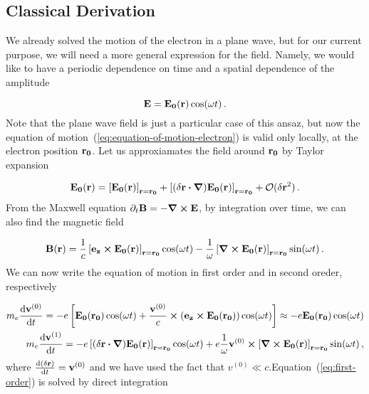\documentclass[12pt, class=report, crop=false]{standalone}
\begin{document}
\subsection{Classical Derivation}

We already solved the motion of the electron in a plane wave, but for our current purpose, we will need a more general expression for the field. Namely, we would like to have a periodic dependence on time and a spatial dependence of the amplitude

\begin{equation}
  \vb{E} = \vb{E_0}(\vb{r}) \cos(\omega t)\,.
\end{equation}
Note that the plane wave field is just a particular case of this ansaz, but now the equation of motion~(\ref{eq:equation-of-motion-electron}) is valid only locally, at the electron position \(\vb{r_0}\). Let us approxiamates the field around \(\vb{r_0}\) by Taylor expansion

\begin{equation}
  \vb{E_0}(\vb{r}) = \left[\vb{E_0}(\vb{r})\right]_{\vb{r}=\vb{r_0}} + \left[(\delta \vb{r}\vdot\grad)\vb{E_0}(\vb{r})\right] _{\vb{r}=\vb{r_0}} + \mathcal{O}(\delta\vb{r}^2)\,.
\end{equation}
From the Maxwell equation \(\partial_t \vb{B} = - \curl{\vb{E}}\), by integration over time, we can also find the magnetic field

\begin{equation}
  \vb{B}(\vb{r}) =\frac{1}{c}\left[\vb{e_z} \cp \vb{E_0}(\vb{r})\right]_{\vb{r}=\vb{r_0}} \cos(\omega t) - \frac{1}{\omega} \left[\curl{\vb{E_0}(\vb{r})}\right]_{\vb{r}=\vb{r_0}} \sin(\omega t)\,.
\end{equation}
We can now write the equation of motion in first order and in second oreder, respectively

\begin{subequations}
  \begin{align}
    \label{eq:first-order}
    m_e \dv{\vb{v}^{(0)}}{t} = - e \left[\vb{E_0}(\vb{r_0}) \cos(\omega t) + \frac{\vb{v}^{(0)}}{c}\cp \left(\vb{e_z} \cp \vb{E_0}(\vb{r_0}) \right) \cos(\omega t)\right] \approx - e \vb{E_0}(\vb{r_0}) \cos(\omega t)\\
    \label{eq:second-order}
    m_e\dv{\vb{v}^{(1)}}{t} = - e \left[ (\delta\vb{r}\vdot\grad) \vb{E_0}(\vb{r})\right]_{\vb{r}=\vb{r_0}} \cos(\omega t) + e \frac{1}{\omega} \vb{v}^{(0)}\cp \left[\curl{\vb{E_0}(\vb{r})}\right]_{\vb{r}=\vb{r_0}} \sin(\omega t) \,,
  \end{align}
\end{subequations}
where \(\dv{(\delta \vb{r})}{t} = \vb{v}^{(0)}\) and we have used the fact that \(v^{(0)}\ll c\).Equation~(\ref{eq:first-order}) is solved by direct integration
\end{document}
